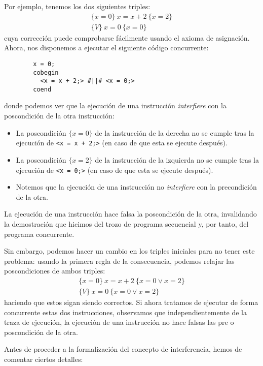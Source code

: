 \begin{ejemplo}
    Por ejemplo, tenemos los dos siguientes triples:
    \begin{gather*}
        \{x=0\}\ x=x+2\ \{x=2\} \\
        \{V\}\ x=0\ \{x=0\}
    \end{gather*}
    cuya corrección puede comprobarse fácilmente usando el axioma de asignación.\\

    Ahora, nos disponemos a ejecutar el siguiente código concurrente:
    \begin{verbatim}
        x = 0;
        cobegin
          <x = x + 2;> #||# <x = 0;>
        coend
    \end{verbatim}
    donde podemos ver que la ejecución de una instrucción \textit{interfiere} con la poscondición de la otra instrucción:
    \begin{itemize}
        \item La poscondición $\{x=0\}$ de la instrucción de la derecha no se cumple tras la ejecución de \verb|<x = x + 2;>| (en caso de que esta se ejecute después).
        \item La poscondición $\{x=2\}$ de la instrucción de la izquierda no se cumple tras la ejecución de \verb|<x = 0;>| (en caso de que esta se ejecute después).
        \item Notemos que la ejecución de una instrucción no \textit{interfiere} con la precondición de la otra.
    \end{itemize}
    La ejecución de una instrucción hace falsa la poscondición de la otra, invalidando la demostración que hicimos del trozo de programa secuencial y, por tanto, del programa concurrente.

    Sin embargo, podemos hacer un cambio en los triples iniciales para no tener este problema: usando la primera regla de la consecuencia, podemos relajar las poscondiciones de ambos triples:
    \begin{gather*}
        \{x=0\}\ x=x+2\ \{x=0 \lor x=2\} \\
        \{V\}\ x=0\ \{x=0 \lor x=2\}
    \end{gather*}
    haciendo que estos sigan siendo correctos. Si ahora tratamos de ejecutar de forma concurrente estas dos instrucciones, observamos que independientemente de la traza de ejecución, la ejecución de una instrucción no hace falsas las pre o poscondición de la otra.
\end{ejemplo}
Antes de proceder a la formalización del concepto de interferencia, hemos de comentar ciertos detalles:
